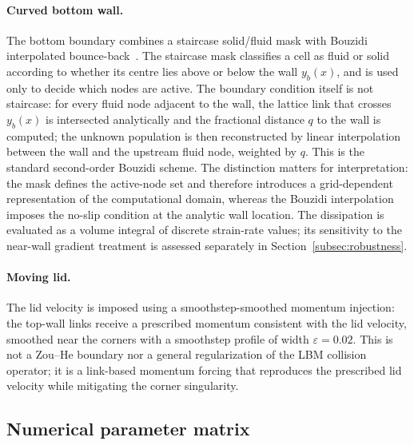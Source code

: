 \paragraph{Curved bottom wall.}
The bottom boundary combines a staircase solid/fluid mask with Bouzidi interpolated bounce-back~\cite{Bouzidi2001}. The staircase mask classifies a cell as fluid or solid according to whether its centre lies above or below the wall $y_b(x)$, and is used only to decide which nodes are active. The boundary condition itself is not staircase: for every fluid node adjacent to the wall, the lattice link that crosses $y_b(x)$ is intersected analytically and the fractional distance $q$ to the wall is computed; the unknown population is then reconstructed by linear interpolation between the wall and the upstream fluid node, weighted by $q$. This is the standard second-order Bouzidi scheme. The distinction matters for interpretation: the mask defines the active-node set and therefore introduces a grid-dependent representation of the computational domain, whereas the Bouzidi interpolation imposes the no-slip condition at the analytic wall location. The dissipation is evaluated as a volume integral of discrete strain-rate values; its sensitivity to the near-wall gradient treatment is assessed separately in Section~\ref{subsec:robustness}.

\paragraph{Moving lid.}
The lid velocity is imposed using a smoothstep-smoothed momentum injection: the top-wall links receive a prescribed momentum consistent with the lid velocity, smoothed near the corners with a smoothstep profile of width $\varepsilon=0.02$. This is not a Zou--He boundary nor a general regularization of the LBM collision operator; it is a link-based momentum forcing that reproduces the prescribed lid velocity while mitigating the corner singularity.

\subsection{Numerical parameter matrix}
\label{subsec:params}

